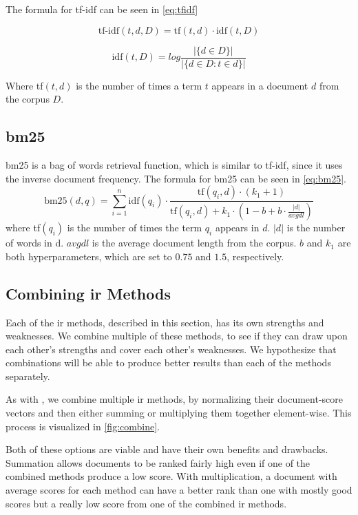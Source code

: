 The formula for \gls{tf-idf} can be seen in \autoref{eq:tfidf}

\begin{equation}\label{eq:tfidf}
	\text{tf-idf}(t, d, D) = \text{tf}(t, d) \cdot \text{idf}(t, D)
\end{equation}

\begin{equation}\label{eq:idf}
	\text{idf}(t,D) = log \frac{|\{d \in D\}|}{|\{d \in D : t \in d\}|}
\end{equation}
	
Where tf$(t, d)$ is the number of times a term $t$ appears in a document $d$ from the corpus $D$.

\subsection{\acrlong{bm25}}
\gls{bm25} is a bag of words retrieval function, which is similar to \gls{tf-idf}, since it uses the inverse document frequency.
The formula for \gls{bm25} can be seen in \autoref{eq:bm25}\cite{bm25}.
\begin{equation}\label{eq:bm25}
	\text{bm25}(d, q) = \sum_{i=1}^{n}\text{idf}(q_i) \cdot \frac{\text{tf}(q_i, d) \cdot (k_1 + 1)}{\text{tf}(q_i, d) + k_1 \cdot (1 - b + b \cdot \frac{|d|}{avgdl})}
\end{equation}
where tf$(q_i)$ is the number of times the term $q_i$ appears in $d$.
$|d|$ is the number of words in d. 
$avgdl$ is the average document length from the corpus.
$b$ and $k_1$ are both hyperparameters, which are set to $0.75$ and $1.5$, respectively.

\subsection{Combining \gls{ir} Methods}
Each of the \gls{ir} methods, described in this section, has its own strengths and weaknesses.
We combine multiple of these methods, to see if they can draw upon each other's strengths and cover each other's weaknesses.
We hypothesize that combinations will be able to produce better results than each of the methods separately.

As with \citet{yang2009topic}, we combine multiple \gls{ir} methods, by normalizing their document-score vectors and then either summing or multiplying them together element-wise.
This process is visualized in \ref{fig:combine}.



Both of these options are viable and have their own benefits and drawbacks.
Summation allows documents to be ranked fairly high even if one of the combined methods produce a low score.
With multiplication, a document with average scores for each method can have a better rank than one with mostly good scores but a really low score from one of the combined \gls{ir} methods.
